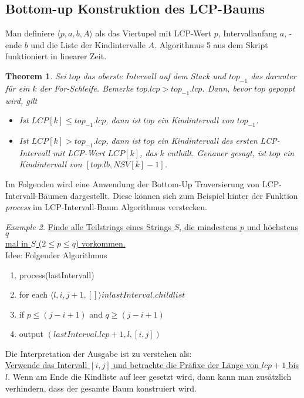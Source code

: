 \documentclass[a4paper, 12pt]{article}
\theoremstyle{plain}
\newtheorem{theorem}{Theorem}[subsection] %
\theoremstyle{definition}
\theoremstyle{lemma}
\theoremstyle{remark}
\theoremstyle{corollary}
\theoremstyle{example}
\newtheorem{example}[theorem]{Example}
\begin{document}
	\subsection{Bottom-up Konstruktion des LCP-Baums}
	Man definiere $\langle p,a,b,A\rangle$ als das Viertupel mit LCP-Wert $p$, Intervallanfang $a$, -ende $b$ und die Liste der Kindintervalle $A$. Algorithmus 5 aus dem Skript funktioniert in linearer Zeit.
	\begin{theorem}
		Sei $top$ das oberste Intervall auf dem Stack und $top_{-1}$ das darunter für ein $k$ der For-Schleife. Bemerke $top.lcp > top_{-1}.lcp$. Dann, bevor $top$ gepoppt wird, gilt \begin{itemize}
			\item Ist $LCP[k]\leq top_{-1}.lcp$, dann ist $top$ ein Kindintervall von $top_{-1}$. 
			\item Ist $LCP[k] > top_{-1}.lcp$, dann ist $top$ ein Kindintervall des ersten LCP-Intervall mit LCP-Wert $LCP[k]$, das $k$ enthält. Genauer gesagt, ist $top$ ein Kindintervall von $[top.lb, NSV[k]-1]$.
		\end{itemize}
	\end{theorem}
	Im Folgenden wird eine Anwendung der Bottom-Up Traversierung von LCP-Intervall-Bäumen dargestellt. Diese können sich zum Beispiel hinter der Funktion \textit{process} im LCP-Intervall-Baum Algorithmus verstecken.
	\begin{example}
		\underline{Finde alle Teilstrings eines Strings $S$, die mindestens $p$ und höchstens $q$}\\\underline{mal in $S$ ($2\leq p \leq q$) vorkommen.}\\
		Idee: Folgender Algorithmus \begin{enumerate}
			\item process(lastIntervall)
			\item for each $\langle l, i, j+1, []\rangle in lastInterval.childlist$
			\item if $p \leq (j-i+1)$ and $q \geq (j-i+1)$
			\item output $(lastInterval.lcp+1, l, [i,j])$
		\end{enumerate}
		Die Interpretation der Ausgabe ist zu verstehen als:\\
		\underline{Verwende das Intervall $[i,j]$ und betrachte die Präfixe der Länge von $lcp+1$ bis $l$}. Wenn am Ende die Kindliste auf leer gesetzt wird, dann kann man zusätzlich verhindern, dass der gesamte Baum konstruiert wird.
	\end{example}
\end{document}
